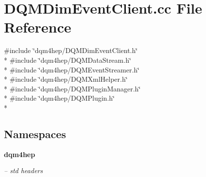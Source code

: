 \section{D\+Q\+M\+Dim\+Event\+Client.\+cc File Reference}
\label{DQMDimEventClient_8cc}
{\ttfamily \#include \char`\"{}dqm4hep/\+D\+Q\+M\+Dim\+Event\+Client.\+h\char`\"{}}\\*
{\ttfamily \#include \char`\"{}dqm4hep/\+D\+Q\+M\+Data\+Stream.\+h\char`\"{}}\\*
{\ttfamily \#include \char`\"{}dqm4hep/\+D\+Q\+M\+Event\+Streamer.\+h\char`\"{}}\\*
{\ttfamily \#include \char`\"{}dqm4hep/\+D\+Q\+M\+Xml\+Helper.\+h\char`\"{}}\\*
{\ttfamily \#include \char`\"{}dqm4hep/\+D\+Q\+M\+Plugin\+Manager.\+h\char`\"{}}\\*
{\ttfamily \#include \char`\"{}dqm4hep/\+D\+Q\+M\+Plugin.\+h\char`\"{}}\\*
\subsection*{Namespaces}
\begin{DoxyCompactItemize}
\item 
 {\bf dqm4hep}
\begin{DoxyCompactList}\small\item\em -- std headers \end{DoxyCompactList}\end{DoxyCompactItemize}
